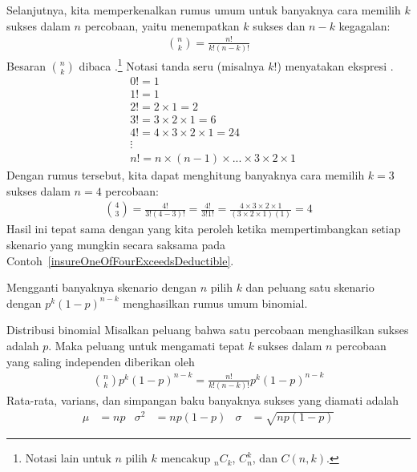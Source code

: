 Selanjutnya, kita memperkenalkan rumus umum untuk banyaknya cara memilih
$k$ sukses dalam $n$ percobaan, yaitu menempatkan $k$ sukses dan
$n-k$ kegagalan:
\begin{align*}
{n\choose k} = \frac{n!}{k! (n - k)!}
\end{align*}
Besaran ${n\choose k}$ dibaca
.\footnote{Notasi lain untuk $n$ pilih $k$
  mencakup $_nC_k$, $C_n^k$, dan $C(n,k)$.}
Notasi tanda seru (misalnya $k!$) menyatakan ekspresi
.\label{factorial_defined}
\begin{align*}
& 0! = 1 \\
& 1! = 1 \\
& 2! = 2\times1 = 2 \\
& 3! = 3\times2\times1 = 6 \\
& 4! = 4\times3\times2\times1 = 24 \\
& \vdots \\
& n! = n\times(n-1)\times...\times3\times2\times1
\end{align*}
Dengan rumus tersebut, kita dapat menghitung banyaknya cara memilih
$k=3$ sukses dalam $n=4$ percobaan:
\begin{align*}
{4 \choose 3} = \frac{4!}{3!(4-3)!}
  = \frac{4!}{3!1!} 
  = \frac{4\times3\times2\times1}{(3\times2\times1) (1)}
  = 4
\end{align*}
Hasil ini tepat sama dengan yang kita peroleh ketika mempertimbangkan
setiap skenario yang mungkin secara saksama pada
Contoh~\ref{insureOneOfFourExceedsDeductible}.

Mengganti banyaknya skenario dengan $n$ pilih $k$ dan peluang satu
skenario dengan $p^k(1-p)^{n-k}$ menghasilkan rumus umum binomial.

\begin{onebox}{Distribusi binomial}
  Misalkan peluang bahwa satu percobaan menghasilkan sukses adalah $p$.
  Maka peluang untuk mengamati tepat $k$ sukses dalam $n$ percobaan yang
  saling independen diberikan oleh\vspace{-1mm}
  \begin{align*}
  {n\choose k}p^k(1-p)^{n-k} = \frac{n!}{k!(n-k)!}p^k(1-p)^{n-k}
  \end{align*}
  Rata-rata, varians, dan simpangan baku banyaknya sukses yang diamati
  adalah\vspace{-2mm}
  \begin{align*}
  \mu &= np
  &\sigma^2 &= np(1-p)
  &\sigma&= \sqrt{np(1-p)}
  \end{align*}
\end{onebox}

